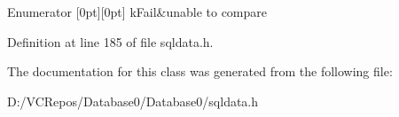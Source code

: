 \begin{DoxyEnumFields}{Enumerator}
[0pt][0pt]{}\mbox{\label{class_i_s_q_l_data_ac3f308048cf5362aba047c5c776c4f7ba46c1b2e071e8ff6a81eb9d0e600a8105}} 
k\+Fail&unable to compare \\
\hline

\end{DoxyEnumFields}


Definition at line 185 of file sqldata.\+h.



The documentation for this class was generated from the following file\+:\begin{DoxyCompactItemize}
\item 
D\+:/\+V\+C\+Repos/\+Database0/\+Database0/sqldata.\+h\end{DoxyCompactItemize}
